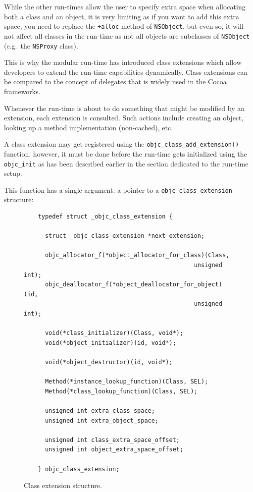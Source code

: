While the other run-times allow the user to specify extra space when allocating both a class and an object, it is very limiting as if you want to add this extra space, you need to replace the \verb=+alloc= method of \verb=NSObject=, but even so, it will not affect all classes in the run-time as not all objects are subclasses of \verb=NSObject= (e.g.\ the \verb=NSProxy= class).

This is why the modular run-time has introduced class extensions which allow developers to extend the run-time capabilities dynamically. Class extensions can be compared to the concept of delegates that is widely used in the Cocoa frameworks. 

Whenever the run-time is about to do something that might be modified by an extension, each extension is consulted. Such actions include creating an object, looking up a method implementation (non-cached), etc.

A class extension may get registered using the \verb=objc_class_add_extension()= function, however, it must be done before the run-time gets initialized using the \verb=objc_init= as has been described earlier in the section dedicated to the run-time setup.

This function has a single argument: a pointer to a \verb=objc_class_extension= structure:

\begin{figure}[H] 
  \begin{verbatim}
    typedef struct _objc_class_extension {

      struct _objc_class_extension *next_extension;
      
      objc_allocator_f(*object_allocator_for_class)(Class,
                                                unsigned int);
      objc_deallocator_f(*object_deallocator_for_object)(id,
                                                unsigned int);
      
      void(*class_initializer)(Class, void*);
      void(*object_initializer)(id, void*);
      
      void(*object_destructor)(id, void*);
        
      Method(*instance_lookup_function)(Class, SEL);
      Method(*class_lookup_function)(Class, SEL);
      
      unsigned int extra_class_space;
      unsigned int extra_object_space;
      
      unsigned int class_extra_space_offset;
      unsigned int object_extra_space_offset;
      
    } objc_class_extension;
  \end{verbatim}
  \centering{}
  \caption{Class extension structure.}
  \label{fig:class_ext_struct}
\end{figure}

